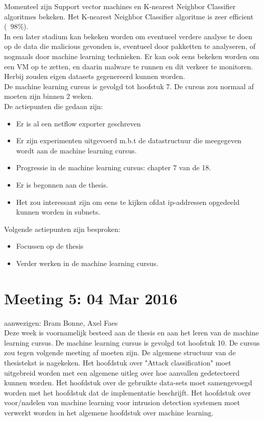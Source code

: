 \noindent Momenteel zijn Support vector machines en K-nearest Neighbor Classifier algoritmes bekeken. Het K-nearest Neighbor Classifier algoritme is zeer efficient (~98\%).\\

\noindent In een later stadium kan bekeken worden om eventueel verdere analyse te doen op de data die malicious gevonden is, eventueel door pakketten te analyseren, of nogmaals door machine learning technieken. Er kan ook eens bekeken worden om een VM op te zetten, en daarin malware te runnen en dit verkeer te monitoren. Herbij zouden eigen datasets gegenereerd kunnen worden.\\

\noindent De machine learning cursus is gevolgd tot hoofstuk 7. De cursus zou normaal af moeten zijn binnen 2 weken. \\

\noindent De actiepunten die gedaan zijn:
\begin{itemize}  
		\item Er is al een netflow exporter geschreven
        \item Er zijn experimenten uitgevoerd m.b.t de datastructuur die meegegeven wordt aan de machine learning cursus.
        \item Progressie in de machine learning cursus: chapter 7 van de 18.
        \item Er is begonnen aan de thesis. 
        \item Het zou interessant zijn om eens te kijken ofdat ip-addressen opgedeeld kunnen worden in subnets.
\end{itemize}

\noindent Volgende actiepunten zijn besproken:
\begin{itemize}  
        \item Focussen op de thesis
        \item Verder werken in de machine learning cursus.
\end{itemize}

\section{Meeting 5: 04 Mar 2016}
aanwezigen: Bram Bonne, Axel Faes\\

\noindent Deze week is voornamelijk besteed aan de thesis en aan het leren van de machine learning cursus. De machine learning cursus is gevolgd tot hoofstuk 10. De cursus zou tegen volgende meeting af moeten zijn. De algemene structuur van de thesistekst is nagekeken. Het hoofdstuk over "Attack classification" moet uitgebreid worden met een algemene uitleg over hoe aanvallen gedetecteerd kunnen worden. Het hoofdstuk over de gebruikte data-sets moet samengevoegd worden met het hoofdstuk dat de implementatie beschrijft. Het hoofdstuk over voor/nadelen van machine learning voor intrusion detection systemen moet verwerkt worden in het algemene hoofdstuk over machine learning.\\

